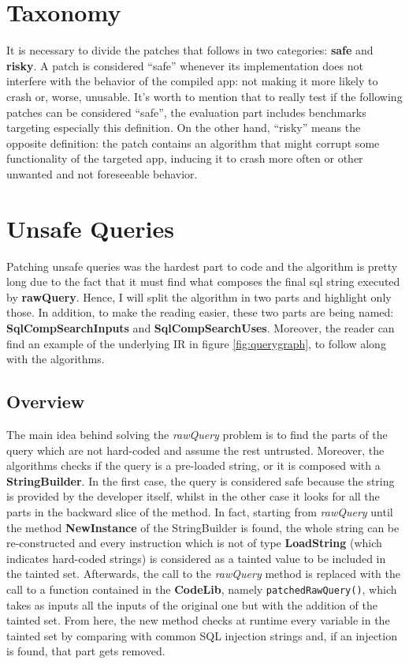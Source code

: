 \section{Taxonomy}
It is necessary to divide the patches that follows in two categories: \textbf{safe} and \textbf{risky}.
A patch is considered \enquote{safe} whenever its implementation does not interfere with the behavior of the compiled app: not making it more likely to crash or, worse, unusable. It's worth to mention that to really test if the following patches can be considered \enquote{safe}, the evaluation part includes benchmarks targeting especially this definition. On the other hand, \enquote{risky} means the opposite definition: the patch contains an algorithm that might corrupt some functionality of the targeted app, inducing it to crash more often or other unwanted and not foreseeable behavior.


\section{Unsafe Queries}

Patching unsafe queries was the hardest part to code and the algorithm is pretty long due to the fact that it must find what composes the final sql string executed by \textbf{rawQuery}. Hence, I will split the algorithm in two parts and highlight only those. In addition, to make the reading easier, these two parts are being named: \textbf{SqlCompSearchInputs} and \textbf{SqlCompSearchUses}. Moreover, the reader can find an example of the underlying IR in figure \ref{fig:querygraph}, to follow along with the algorithms.

\subsection{Overview}
The main idea behind solving the \emph{rawQuery} problem is to find the parts of the query which are not hard-coded and assume the rest untrusted. Moreover, the algorithms checks if the query is a pre-loaded string, or it is composed with a \textbf{StringBuilder}. In the first case, the query is considered safe because the string is provided by the developer itself, whilst in the other case it looks for all the parts in the backward slice of the method. In fact, starting from \emph{rawQuery} until the method \textbf{NewInstance} of the StringBuilder is found, the whole string can be re-constructed and every instruction which is not of type \textbf{LoadString} (which indicates hard-coded strings) is considered as a tainted value to be included in the tainted set.
Afterwards, the call to the \emph{rawQuery} method is replaced with the call to a function contained in the \textbf{CodeLib}, namely \texttt{patchedRawQuery()}, which takes as inputs all the inputs of the original one but with the addition of the tainted set. From here, the new method checks at runtime every variable in the tainted set by comparing with common SQL injection strings and, if an injection is found, that part gets removed.

